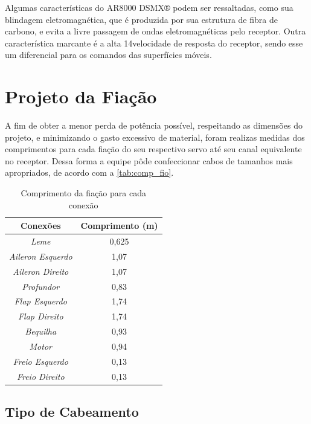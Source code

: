 Algumas características do AR8000 DSMX® podem ser ressaltadas, como sua
blindagem eletromagnética, que é produzida por sua estrutura de fibra de carbono, e evita a
livre passagem de ondas eletromagnéticas pelo receptor. Outra característica marcante é a alta
14velocidade de resposta do receptor, sendo esse um diferencial para os comandos das superfícies
móveis.

\chapter{Projeto da Fiação}\label{fio.cap}

A fim de obter a menor perda de potência possível, respeitando as dimensões do projeto,
e minimizando o gasto excessivo de material, foram realizas medidas dos comprimentos para
cada fiação do seu respectivo servo até seu canal equivalente no receptor. Dessa forma a equipe
pôde confeccionar cabos de tamanhos mais apropriados, de acordo com a \autoref{tab:comp_fio}.

\begin{table}[H]
\centering
\caption{Comprimento da fiação para cada conexão}
\label{tab:comp_fio}
\begin{tabular}{|c|c|}
\hline
\textbf{Conexões}         & \textbf{Comprimento (m)} \\ \hline
\textit{Leme}             & 0,625                    \\ \hline
\textit{Aileron Esquerdo} & 1,07                     \\ \hline
\textit{Aileron Direito}  & 1,07                     \\ \hline
\textit{Profundor}        & 0,83                     \\ \hline
\textit{Flap Esquerdo}    & 1,74                     \\ \hline
\textit{Flap Direito}     & 1,74                     \\ \hline
\textit{Bequilha}         & 0,93                     \\ \hline
\textit{Motor}            & 0,94                     \\ \hline
\textit{Freio Esquerdo}   & 0,13                     \\ \hline
\textit{Freio Direito}    & 0,13                     \\ \hline
\end{tabular}
\end{table}

\section{Tipo de Cabeamento}

